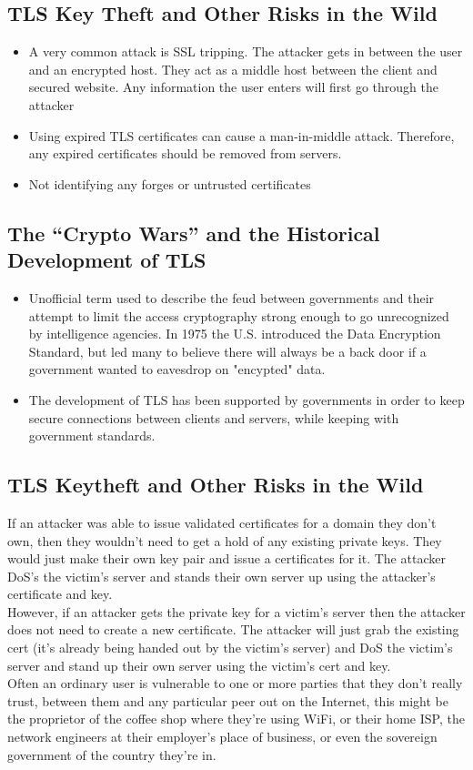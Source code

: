 \documentclass[11pt]{article} %
\begin{document}
\subsection{TLS Key Theft and Other Risks in the Wild}
\begin{itemize}
  \item A very common attack is SSL tripping. The attacker gets in between the user and an encrypted host. They act as a middle host between the client and secured website. Any information the user enters will first go through the attacker
  \item Using expired TLS certificates can cause a man-in-middle attack. Therefore, any expired certificates should be removed from servers.
 \item Not identifying any forges or untrusted certificates
\end{itemize}

\subsection{The “Crypto Wars” and the Historical Development of TLS}
\begin{itemize}
  \item Unofficial term used to describe the feud between governments and their attempt to limit the access cryptography strong enough to go unrecognized by intelligence agencies. In 1975 the U.S. introduced the Data Encryption Standard, but led many to believe there will always be a back door if a government wanted to eavesdrop on "encypted" data.
  \item The development of TLS has been supported by governments in order to keep secure connections between clients and servers, while keeping with government standards.
\end{itemize}

\subsection{TLS Keytheft and Other Risks in the Wild}
If an attacker was able to issue validated certificates for a domain they don’t own, then they wouldn’t need to get a hold of any existing private keys. They would just make their own key pair and issue a certificates for it. The attacker DoS’s the victim’s server and stands their own server up using the attacker’s certificate and key.
\\
However, if an attacker gets the private key for a victim’s server then the attacker does not need to create a new certificate. The attacker will just grab the existing cert (it’s already being handed out by the victim’s server) and DoS the victim’s server and stand up their own server using the victim’s cert and key.
\\
Often an ordinary user is vulnerable to one or more parties that they don't really trust, between them and any particular peer out on the Internet, this might be the proprietor of the coffee shop where they're using WiFi, or their home ISP, the network engineers at their employer's place of business, or even the sovereign government of the country they're in.
\end{document}
